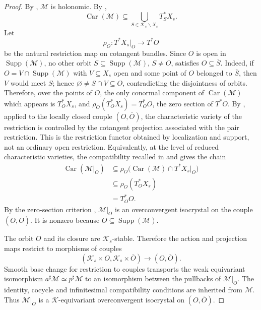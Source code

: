 \documentclass[11pt]{amsart}
\theoremstyle{plain}
\theoremstyle{definition}
\theoremstyle{remark}
\newcommand{\Car}{\operatorname{Car}}
\newcommand{\Supp}{\operatorname{Supp}}
\begin{document}
\begin{proof}
By , \(\mathcal M\) is holonomic.  By
,
\[
  \Car(\mathcal M)
  \subseteq
  \bigcup_{S\in\mathcal K_s\backslash X_s}T^*_S X_s.
\]
Let
\[
  \rho_O:T^*X_s|_O\longrightarrow T^*O
\]
be the natural restriction map on cotangent bundles.  Since \(O\) is open in
\(\Supp(\mathcal M)\), no other orbit \(S\subseteq\Supp(\mathcal M)\),
\(S\neq O\), satisfies \(O\subseteq\overline S\).  Indeed, if
\(O=V\cap\Supp(\mathcal M)\) with \(V\subseteq X_s\) open and some point of
\(O\) belonged to \(\overline S\), then \(V\) would meet \(S\); hence
\(\varnothing\neq S\cap V\subseteq O\), contradicting the disjointness of
orbits.  Therefore, over the points of \(O\), the only conormal component of
\(\Car(\mathcal M)\) which appears is \(T^*_O X_s\), and
\(\rho_O(T^*_O X_s)=T^*_O O\), the zero section of \(T^*O\).  By
, applied to the locally closed couple
\((O,\overline O)\), the characteristic variety of the restriction is controlled
by the cotangent projection associated with the pair restriction.
This is the restriction functor obtained by localization and support, not an
ordinary open restriction. Equivalently, at the level of reduced characteristic
varieties, the compatibility recalled in  and
\cite[\S2.1, Lemmas 2.1.1--2.1.2]{HuygheSchmidtIntermediate} gives the
chain
\begin{equation}
\label{eq:restriction-characteristic-chain}
\begin{aligned}
  \Car(\mathcal M|_O)
  &\subseteq
  \rho_O\bigl(\Car(\mathcal M)\cap T^*X_s|_O\bigr) \\
  &\subseteq
  \rho_O(T^*_O X_s) \\
  &=T^*_O O.
\end{aligned}
\end{equation}
By the zero-section criterion \cite[Theorem 2.1.4]{HuygheSchmidtIntermediate},
\(\mathcal M|_O\) is an overconvergent isocrystal on the couple
\((O,\overline O)\).  It is nonzero because \(O\subseteq\Supp(\mathcal M)\).

The orbit \(O\) and its closure are \(\mathcal K_s\)-stable.  Therefore the
action and projection maps restrict to morphisms of couples
\[
  (\mathcal K_s\times O,\mathcal K_s\times\overline O)
  \longrightarrow
  (O,\overline O).
\]
Smooth base change for restriction to couples transports the weak equivariant
isomorphism \(a^\sharp\mathcal M\simeq p^\sharp\mathcal M\) to an isomorphism
between the pullbacks of \(\mathcal M|_O\).  The identity, cocycle and
infinitesimal compatibility conditions are inherited from \(\mathcal M\).  Thus
\(\mathcal M|_O\) is a \(\mathcal K\)-equivariant overconvergent isocrystal on
\((O,\overline O)\).
\end{proof}
\end{document}
